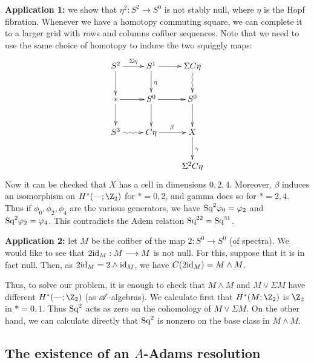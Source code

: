 \documentclass[11pt]{article}
\newcommand{\myheading}[1]
{{\noindent\Large #1}

}
\renewcommand{\myheading}[1]{\subsection{#1}}
\begin{document}
\begin{applications of steenrod squares}
\textbf{Application 1:} we show that $\eta^2:S^2\to S^0$ is not stably null,
where $\eta$ is the Hopf fibration. Whenever we have a homotopy commuting
square, we can complete it to a larger grid with rows and columns cofiber
sequences. Note that we need to use the same choice of homotopy to induce the
two squiggly maps:
\[\xymatrix{
S^2\ar[r]^{\Sigma\eta}\ar[d]&S^1\ar[r] \ar[d]^\eta&\Sigma C\eta\ar@{~>}[d]\\
\text{$*$}\ar[r]\ar[d]& S^0\ar[r]\ar[d]&S^0\ar[d]\\
S^3\ar@{~>}[r]&C\eta\ar[r]^\beta&X\ar[d]^\gamma\\
&&\Sigma^2C\eta
}\]
Now it can be checked that $X$ has a cell in dimensions $0,2,4$. Moreover,
$\beta$ induces an isomorphism on $H^*(\DASH;\Z_2)$ for $*=0,2$, and gamma does
so for $*=2,4$. Thus if $\phi_0,\phi_2,\phi_4$ are the various generators, we
have $\textup{Sq}^2\varphi_0=\varphi_2$ and $\textup{Sq}^2\varphi_2=\varphi_4$. This contradicts the Adem
relation $\textup{Sq}^{22}=\textup{Sq}^{31}$.

\textbf{Application 2:}  let $M$ be the cofiber of the map $2:S^0\to S^0$ (of
spectra). We would like to see that $2\textup{id}_M:M\longrightarrow M$ is not null. For this,
suppose that it is in fact null. Then, as $2\textup{id}_M=2\wedge\textup{id}_M$, we have
$C(2\textup{id}_M)=M\wedge M$.

Thus, to solve our problem, it is enough to check that $M\wedge M$ and $M\vee
\Sigma M$ have different $H^*(\DASH;\Z_2)$ (as $\mathscr{A}$-algebras). We calculate
first that $H^*(M;\Z_2)$ is $\Z_2$ in $*=0,1$. Thus $\textup{Sq}^2$ acts as zero on the
cohomology of $M\vee \Sigma M$. On the other hand, we can calculate directly
that $\textup{Sq}^2$ is nonzero on the base class in $M\wedge M$.


\end{applications of steenrod squares}
\myheading{The existence of an \texorpdfstring{$A$}{A}-Adams resolution}
\end{document}
